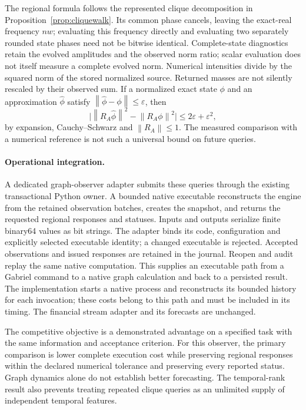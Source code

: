 \documentclass[11pt,a4paper]{article}
\theoremstyle{definition}\newtheorem{definition}[theorem]{Definition}
\newcommand{\norm}[1]{\left\lVert#1\right\rVert}
\begin{document}
The regional formula follows the represented clique decomposition in
Proposition~\ref{prop:cliquewalk}. Its common phase cancels, leaving the exact-real frequency $nw$; evaluating this frequency directly and evaluating two separately rounded state phases need not be bitwise identical.
Complete-state diagnostics retain the evolved amplitudes and the observed
norm ratio; scalar evaluation does not itself measure a complete evolved norm.
Numerical intensities divide by the squared norm of the stored normalized source. Returned masses are not silently rescaled by their observed sum.
If a normalized exact state $\phi$ and an approximation $\widehat\phi$ satisfy
$\norm{\widehat\phi-\phi}\leq\varepsilon$, then
\[
 \bigl|\norm{R_A\widehat\phi}^2-\norm{R_A\phi}^2\bigr|
 \leq 2\varepsilon+\varepsilon^2,
\]
by expansion, Cauchy--Schwarz and $\norm{R_A}\leq1$.
The measured comparison with a numerical reference is not such a universal
bound on future queries.

\paragraph{Operational integration.}
A dedicated graph-observer adapter submits these queries through the existing
transactional Python owner. A bounded native executable reconstructs the engine
from the retained observation batches, creates the snapshot, and returns the
requested regional responses and statuses. Inputs and outputs serialize finite
binary64 values as bit strings. The adapter binds its code, configuration and
explicitly selected executable identity; a changed executable is rejected.
Accepted observations and issued responses are retained in the journal. Reopen
and audit replay the same native computation. This supplies an executable path
from a Gabriel command to a native graph calculation and back to a persisted
result. The implementation starts a native process and reconstructs its bounded
history for each invocation; these costs belong to this path and must be
included in its timing. The financial stream adapter and its forecasts are
unchanged.

The competitive objective is a demonstrated advantage on a specified task
with the same information and acceptance criterion. For this observer, the
primary comparison is lower complete execution cost while preserving regional
responses within the declared numerical tolerance and preserving every
reported status. Graph dynamics alone do not establish better forecasting.
The temporal-rank result also prevents treating repeated clique queries as an
unlimited supply of independent temporal features.
\end{document}
